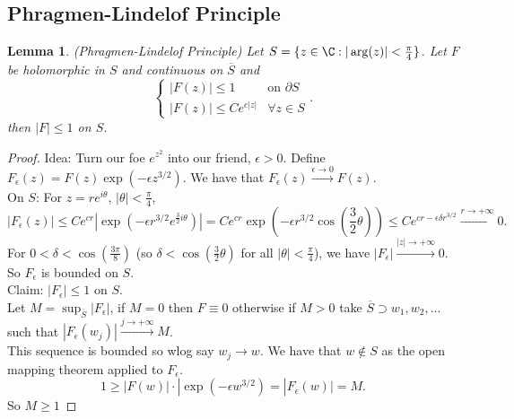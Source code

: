 \documentclass[a4paper]{article}
\newtheorem{lem}[thm]{Lemma}
\begin{document}
\subsection{Phragmen-Lindelof Principle}
\begin{lem}
    (Phragmen-Lindelof Principle) Let $S= \{z\in \C: |\arg(z)|< \frac{\pi}{4}\}$. Let $F$ be holomorphic in $S$ and continuous on $\overline{S}$ and 
    \[
    \begin{cases}
        |F(z)|\leq 1 & \text{on } \partial S  \\
        |F(z)|\leq Ce^{c|z|} & \forall z\in S
    \end{cases}
    .\] 
    then $|F|\leq 1$ on $S$. 
\end{lem}
\begin{proof}
    Idea: Turn our foe $e^{z^2}$ into our friend, $\epsilon>0$. Define $F_\epsilon(z)=F(z)\exp(-\epsilon z^{3/2})$. We have that $F_\epsilon(z)\xrightarrow{\epsilon\to 0} F(z)$. \\
    On $S$: 
    For $z=re^{i\theta}$, $|\theta|< \frac{\pi}{4}$, 
    \[
    |F_\epsilon(z)|\leq Ce^{cr}|\exp \left( -\epsilon r^{3/2} e^{ \frac{3}{2}i \theta} \right)|=Ce^{cr}\exp \left( -\epsilon r^{3/2} \cos \left( \frac{3}{2} \theta \right) \right)\leq Ce^{cr-\epsilon\delta r^{ 3/2}}\xrightarrow{r\to +\infty} 0
    .\] 
    For $0<\delta<\cos \left( \frac{3\pi}{8} \right)$ (so $\delta<\cos \left( \frac{3}{2}\theta \right)$ for all $|\theta|<\frac{\pi}{4}$), we have $|F_\epsilon|\xrightarrow{|z|\to+\infty} 0$. \\
    So $F_\epsilon$ is bounded on $S$. \\
    Claim: $|F_\epsilon|\leq 1$ on $S$. \\
    Let $M=\sup_{\overline{S}}|F_\epsilon|$, if $M=0$ then $F\equiv 0$ otherwise if $M>0$ take $\overline{S}\supset w_1,w_2,...$ such that $|F_\epsilon(w_j)|\xrightarrow{j\to+\infty} M$. \\
    This sequence is bounded so wlog say $w_j\to w$. We have that $w\notin S$ as the open mapping theorem applied to $F_\epsilon$. 
    \[
    1\geq|F(w)|\cdot |\exp(-\epsilon w^{3/2})=|F_\epsilon(w)|=M
    .\] 
    So $M\geq 1$
\end{proof}
\end{document}
